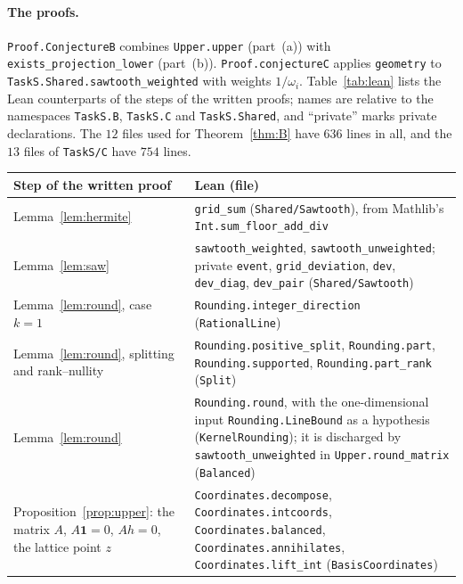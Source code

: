 \documentclass[11pt]{article}
\theoremstyle{definition}
\theoremstyle{remark}
\newcommand{\one}{\mathbf 1}
\begin{document}
{\paragraph{The proofs.}
\texttt{Proof.ConjectureB} combines \texttt{Upper.upper} (part~(a)) with
\texttt{exists\_\allowbreak projection\_\allowbreak lower} (part~(b)).
\texttt{Proof.conjectureC} applies \texttt{geometry} to
\texttt{TaskS.Shared.sawtooth\_\allowbreak weighted} with weights
$1/\omega_i$. Table~\ref{tab:lean} lists the Lean counterparts of the steps of
the written proofs; names are relative to the namespaces \texttt{TaskS.B},
\texttt{TaskS.C} and \texttt{TaskS.Shared}, and ``private'' marks private
declarations. The $12$ files used for Theorem~\ref{thm:B} have $636$ lines
in all, and the $13$ files of \texttt{TaskS/C} have $754$ lines.

\begin{table}[ht]
\centering\footnotesize
\renewcommand{\arraystretch}{1.05}
\begin{tabular}{@{}>{\raggedright\arraybackslash}p{}>{\raggedright\arraybackslash}p{}@{}}
\hline
Step of the written proof & Lean (file) \\
\hline
Lemma~\ref{lem:hermite} & \texttt{grid\_sum} (\texttt{Shared/Sawtooth}), from
Mathlib's \texttt{Int.sum\_floor\_add\_div} \\
Lemma~\ref{lem:saw} & \texttt{sawtooth\_weighted}, \texttt{sawtooth\_unweighted};
private \texttt{event}, \texttt{grid\_deviation}, \texttt{dev}, \texttt{dev\_diag},
\texttt{dev\_pair} (\texttt{Shared/Sawtooth}) \\
\hline
Lemma~\ref{lem:round}, case $k=1$ & \texttt{Rounding.integer\_direction}
(\texttt{RationalLine}) \\
Lemma~\ref{lem:round}, splitting and rank--nullity &
\texttt{Rounding.positive\_split}, \texttt{Rounding.part}, \texttt{Rounding.supported},
\texttt{Rounding.part\_rank} (\texttt{Split}) \\
Lemma~\ref{lem:round} & \texttt{Rounding.round}, with the one-dimensional input
\texttt{Rounding.LineBound} as a hypothesis (\texttt{KernelRounding}); it is
discharged by \texttt{sawtooth\_unweighted} in \texttt{Upper.round\_matrix}
(\texttt{Balanced}) \\
Proposition~\ref{prop:upper}: the matrix $A$, $A\one=0$, $Ah=0$, the lattice point $z$ &
\texttt{Coordinates.decompose}, \texttt{Coordinates.intcoords},
\texttt{Coordinates.balanced}, \texttt{Coordinates.annihilates},
\texttt{Coordinates.lift\_int} (\texttt{BasisCoordinates}) \\

\end{tabular}
\end{table}}
\end{document}
